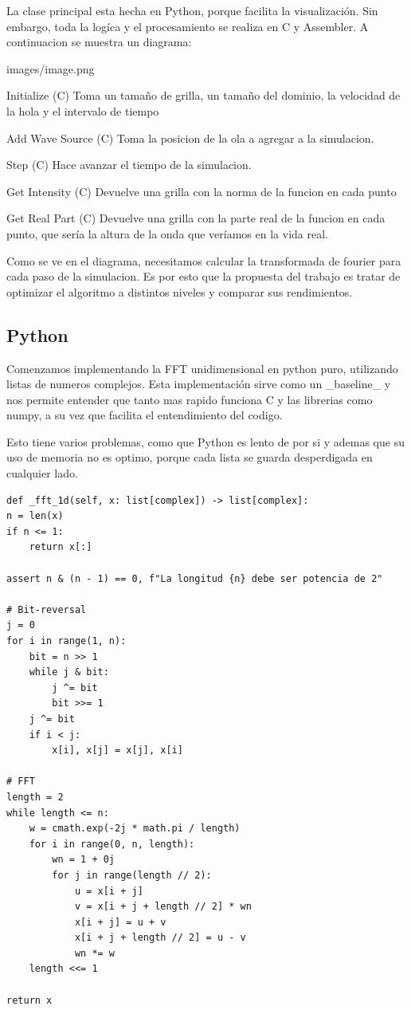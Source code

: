 \documentclass[a4paper]{article}
\begin{document}
La clase principal esta hecha en Python, porque facilita la visualización. Sin embargo, toda la logíca y el procesamiento se realiza
en C y Assembler. A continuacion se muestra un diagrama:

images/image.png

Initialize (C)
Toma un tamaño de grilla, un tamaño del dominio, la velocidad de la hola y el intervalo de tiempo

Add Wave Source (C)
Toma la posicion de la ola a agregar a la simulacion.

Step (C)
Hace avanzar el tiempo de la simulacion.

Get Intensity (C)
Devuelve una grilla con la norma de la funcion en cada punto

Get Real Part (C)
Devuelve una grilla con la parte real de la funcion en cada punto, que sería la altura de la onda que veríamos en la vida real.

Como se ve en el diagrama, necesitamos calcular la transformada de fourier para cada paso de la simulacion. Es por esto que la
propuesta del trabajo es tratar de optimizar el algoritmo a distintos niveles y comparar sus rendimientos.

\subsection{Python}
Comenzamos implementando la FFT unidimensional en python puro, utilizando listas de numeros complejos. Esta implementación sirve
como un _baseline_ y nos permite entender que tanto mas rapido funciona C y las librerias como numpy, a su vez que facilita
el entendimiento del codigo.

Esto tiene varios problemas, como que Python es lento de por si y ademas que su uso de memoria no es optimo, porque cada lista se
guarda desperdigada en cualquier lado.

\begin{verbatim}
def _fft_1d(self, x: list[complex]) -> list[complex]:
n = len(x)
if n <= 1:
    return x[:]

assert n & (n - 1) == 0, f"La longitud {n} debe ser potencia de 2"

# Bit-reversal
j = 0
for i in range(1, n):
    bit = n >> 1
    while j & bit:
        j ^= bit
        bit >>= 1
    j ^= bit
    if i < j:
        x[i], x[j] = x[j], x[i]

# FFT
length = 2
while length <= n:
    w = cmath.exp(-2j * math.pi / length)
    for i in range(0, n, length):
        wn = 1 + 0j
        for j in range(length // 2):
            u = x[i + j]
            v = x[i + j + length // 2] * wn
            x[i + j] = u + v
            x[i + j + length // 2] = u - v
            wn *= w
    length <<= 1

return x
\end{verbatim}
\end{document}
